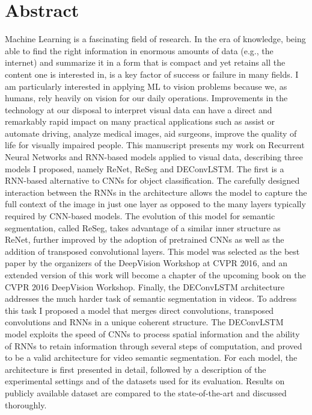 \chapter*{Abstract}
Machine Learning is a fascinating field of research. In the era of knowledge,
being able to find the right information in enormous amounts of data (e.g., the
internet) and summarize it in a form that is compact and yet retains all the
content one is interested in, is a key factor of success or failure in many
fields. I am particularly interested in applying ML to vision problems because
we, as humans, rely heavily on vision for our daily operations. Improvements in
the technology at our disposal to interpret visual data can have a direct and
remarkably rapid impact on many practical applications such as assist or
automate driving, analyze medical images, aid surgeons, improve the quality of
life for visually impaired people. This manuscript presents my work on
Recurrent Neural Networks and RNN-based models applied to visual data,
describing three models I proposed, namely ReNet, ReSeg and DEConvLSTM. The
first is a RNN-based alternative to CNNs for object classification. The
carefully designed interaction between the RNNs in the architecture allows the model to capture the
full context of the image in just one layer as opposed to the many layers
typically required by CNN-based models. The evolution of this model for
semantic segmentation, called ReSeg, takes advantage of a similar inner
structure as ReNet, further improved by the adoption of pretrained CNNs as well
as the addition of transposed convolutional layers. This model was selected as
the best paper by the organizers of the DeepVision Workshop at CVPR 2016, and
an extended version of this work will become a chapter of the upcoming book on
the CVPR 2016 DeepVision Workshop.  Finally, the DEConvLSTM architecture
addresses the much harder task of semantic segmentation in videos. To address
this task I proposed a model that merges direct convolutions, transposed
convolutions and RNNs in a unique coherent structure. The DEConvLSTM model
exploits the speed of CNNs to process spatial information and the ability of
RNNs to retain information through several steps of computation, and proved to
be a valid architecture for video semantic segmentation. For each model, the
architecture is first presented in detail, followed by a description of the
experimental settings and of the datasets used for its evaluation. Results on
publicly available dataset are compared to the state-of-the-art and discussed
thoroughly.
